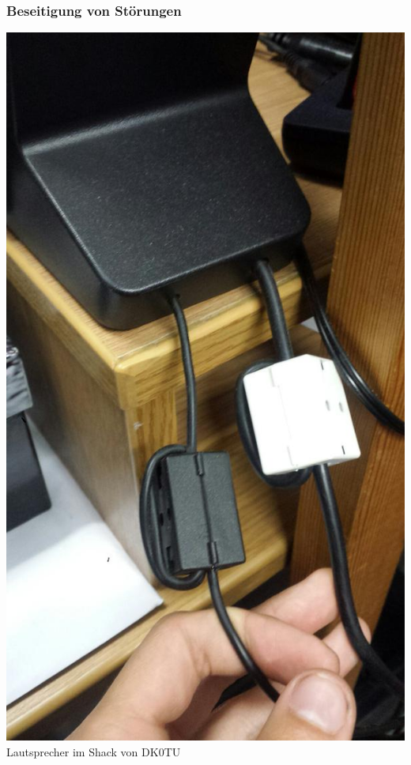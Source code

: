 \begin{frame}
    \frametitle{Beseitigung von Störungen}
    \begin{center}
		\includegraphics[height=0.87\textheight]{a19/2Filter.jpg}\\
        \tiny Lautsprecher im Shack von DK0TU \\[1em]
    \end{center}
\end{frame}


